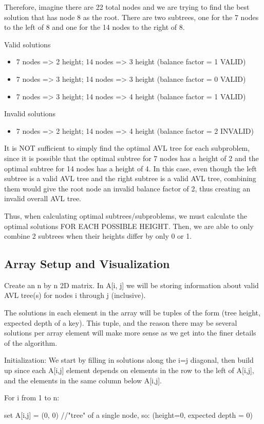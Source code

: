 \documentclass[a4paper]{article}
\begin{document}
Therefore, imagine there are 22 total nodes and we are trying to find the best solution that has node 8 as the root. There are two subtrees, one for the 7 nodes to the left of 8 and one for the 14 nodes to the right of 8.

Valid solutions
\begin{itemize}
    \item 7 nodes => 2 height; 14 nodes => 3 height (balance factor = 1 VALID)
    \item 7 nodes => 3 height; 14 nodes => 3 height (balance factor = 0 VALID)
    \item 7 nodes => 3 height; 14 nodes => 4 height (balance factor = 1 VALID)
\end{itemize}

Invalid solutions
\begin{itemize}
    \item 7 nodes => 2 height; 14 nodes => 4 height (balance factor = 2 INVALID)
\end{itemize}
It is NOT sufficient to simply find the optimal AVL tree for each subproblem, since it is possible that the optimal subtree for 7 nodes has a height of 2 and the optimal subtree for 14 nodes has a height of 4. In this case, even though the left subtree is a valid AVL tree and the right subtree is a valid AVL tree, combining them would give the root node an invalid balance factor of 2, thus creating an invalid overall AVL tree.

Thus, when calculating optimal subtrees/subproblems, we must calculate the optimal solutions FOR EACH POSSIBLE HEIGHT. Then, we are able to only combine 2 subtrees when their heights differ by only 0 or 1.

\subsection{Array Setup and Visualization}

Create an n by n 2D matrix. In A[i, j] we will be storing information about valid AVL tree(s) for nodes i through j (inclusive).

The solutions in each element in the array will be tuples of the form 
(tree height, expected depth of a key).
This tuple, and the reason there may be several solutions per array element will make more sense as we get into the finer details of the algorithm.


Initialization:
We start by filling in solutions along the i=j diagonal, then build up since each A[i,j] element depends on elements in the row to the left of A[i,j], and the elements in the same column below A[i,j].
\begin{myEnumerate}
\item For i from 1 to n:
    \begin{myEnumerate}
    \item set A[i,j] = (0, 0) //"tree" of a single node, so: (height=0, expected depth = 0)
    \end{myEnumerate}
\end{myEnumerate}
\end{document}

